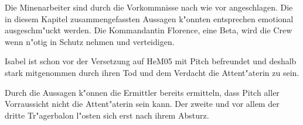 \begin{remarks}
	Die Minenarbeiter sind durch die Vorkommnisse nach wie vor angeschlagen. Die in diesem Kapitel zusammengefassten Aussagen k"onnten entsprechen emotional ausgeschm"uckt werden. Die Kommandantin Florence, eine Beta, wird die Crew wenn n"otig in Schutz nehmen und verteidigen.

	Isabel ist schon vor der Versetzung auf HeM05 mit Pitch befreundet und deshalb stark mitgenommen durch ihren Tod und dem Verdacht die Attent"aterin zu sein.

	Durch die Aussagen k"onnen die Ermittler bereits ermitteln, dass Pitch aller Vorraussicht nicht die Attent"aterin sein kann. Der zweite und vor allem der dritte Tr"agerbalon l"osten sich erst nach ihrem Absturz.		
\end{remarks}
